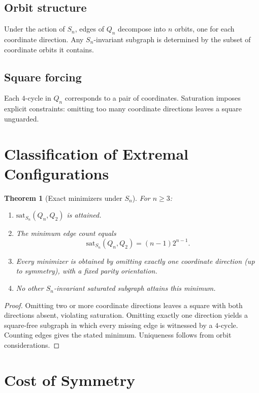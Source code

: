 \documentclass[11pt]{article}
\theoremstyle{plain}
\newtheorem{theorem}{Theorem}[section]
\theoremstyle{definition}
\newcommand{\Qn}{Q_n}
\begin{document}
\subsection{Orbit structure}

Under the action of $S_n$, edges of $\Qn$ decompose into $n$ orbits, one for each coordinate direction.  
Any $S_n$-invariant subgraph is determined by the subset of coordinate orbits it contains.

\subsection{Square forcing}

Each $4$-cycle in $\Qn$ corresponds to a pair of coordinates.  
Saturation imposes explicit constraints: omitting too many coordinate directions leaves a square unguarded.

\section{Classification of Extremal Configurations}

\begin{theorem}[Exact minimizers under $S_n$]
For $n\ge3$:
\begin{enumerate}[label=(\roman*)]
\item $\mathrm{sat}_{S_n}(\Qn,Q_2)$ is attained.
\item The minimum edge count equals
\[
\mathrm{sat}_{S_n}(\Qn,Q_2)
=
(n-1)2^{n-1}.
\]
\item Every minimizer is obtained by omitting exactly one coordinate direction (up to symmetry), with a fixed parity orientation.
\item No other $S_n$-invariant saturated subgraph attains this minimum.
\end{enumerate}
\end{theorem}

\begin{proof}
Omitting two or more coordinate directions leaves a square with both directions absent, violating saturation.  
Omitting exactly one direction yields a square-free subgraph in which every missing edge is witnessed by a $4$-cycle.  
Counting edges gives the stated minimum.  
Uniqueness follows from orbit considerations.
\end{proof}

\section{Cost of Symmetry}
\end{document}
